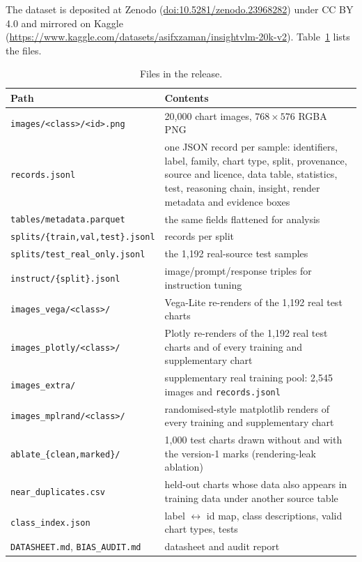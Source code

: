 \documentclass[11pt,a4paper]{article}
\begin{document}
The dataset is deposited at Zenodo (\href{https://doi.org/10.5281/zenodo.23968282}{doi:10.5281/zenodo.23968282}) under CC BY 4.0 and mirrored on
Kaggle (\url{https://www.kaggle.com/datasets/asifxzaman/insightvlm-20k-v2}).
Table~\ref{tab:files} lists the files.

\begin{table}[t]\centering\small
\caption{Files in the release.}
\label{tab:files}
\begin{tabular}{p{4.6cm}p{10.2cm}}
\toprule
\textbf{Path} & \textbf{Contents} \\
\midrule
\texttt{images/<class>/<id>.png} & 20{,}000 chart images, $768\times576$ RGBA PNG \\
\texttt{records.jsonl} & one JSON record per sample: identifiers, label, family, chart type, split, provenance, source and licence, data table, statistics, test, reasoning chain, insight, render metadata and evidence boxes \\
\texttt{tables/metadata.parquet} & the same fields flattened for analysis \\
\texttt{splits/\{train,val,test\}.jsonl} & records per split \\
\texttt{splits/test\_real\_only.jsonl} & the 1{,}192 real-source test samples \\
\texttt{instruct/\{split\}.jsonl} & image/prompt/response triples for instruction tuning \\
\texttt{images\_vega/<class>/} & Vega-Lite re-renders of the 1{,}192 real test charts \\
\texttt{images\_plotly/<class>/} & Plotly re-renders of the 1{,}192 real test charts and of every training and supplementary chart \\
\texttt{images\_extra/} & supplementary real training pool: 2{,}545 images and \texttt{records.jsonl} \\
\texttt{images\_mplrand/<class>/} & randomised-style matplotlib renders of every training and supplementary chart \\
\texttt{ablate\_\{clean,marked\}/} & 1{,}000 test charts drawn without and with the version-1 marks (rendering-leak ablation) \\
\texttt{near\_duplicates.csv} & held-out charts whose data also appears in training data under another source table \\
\texttt{class\_index.json} & label $\leftrightarrow$ id map, class descriptions, valid chart types, tests \\
\texttt{DATASHEET.md}, \texttt{BIAS\_AUDIT.md} & datasheet\cite{datasheets} and audit report \\
\bottomrule
\end{tabular}
\end{table}
\end{document}
